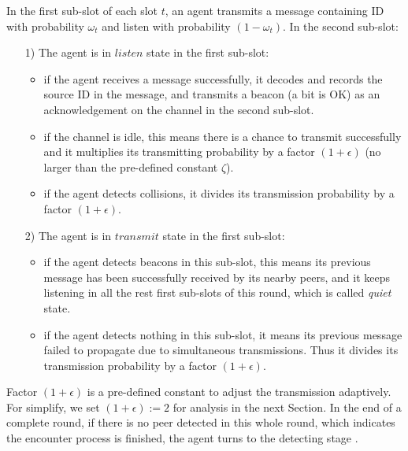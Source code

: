 In the first sub-slot of each slot $t$, an agent transmits a message containing ID 
with probability $\omega_t$ and listen with probability $(1 - \omega_t)$. 
In the second sub-slot: 
\begin{itemize}
    \item[1)] The agent is in $listen$ state in the first sub-slot:
    \begin{itemize}
    \item if the agent receives a message successfully, it 
    decodes and records the source ID in the message, and
    transmits a beacon (a bit is OK) as an acknowledgement 
    on the channel in the second sub-slot. 
    \item if the channel is idle, this means there is a chance to 
    transmit successfully and it multiplies its transmitting 
    probability by a factor $(1+\epsilon)$ (no larger than the pre-defined constant $\zeta$).
    \item if the agent detects collisions, it divides its transmission 
    probability by a factor ${(1+\epsilon)}$. 
    \end{itemize}
    \item[2)] The agent is in $transmit$ state in the first sub-slot:
    \begin{itemize}
    \item if the agent detects beacons in this sub-slot,
    this means its previous message has been successfully received by its nearby
    peers, and it keeps listening in all the rest first sub-slots of this round,
    which is called \emph{quiet} state.
    \item if the agent detects nothing in this sub-slot, it means its previous message
    failed to propagate due to simultaneous transmissions. Thus it divides its transmission 
    probability by a factor ${(1+\epsilon)}$. 
    \end{itemize}
\end{itemize}

Factor ${(1+\epsilon)}$ is a pre-defined constant to adjust the transmission adaptively.
For simplify, we set $(1+\epsilon) := 2$ for analysis in the next Section.
In the end of a complete round, if there is no peer detected in this whole round, 
which indicates the encounter process is finished, the agent turns to the detecting stage .






